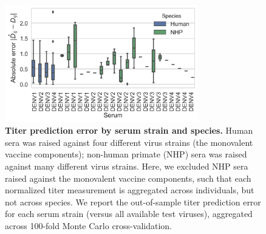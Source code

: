 \documentclass[11pt,oneside,letterpaper]{article}
\begin{document}
\begin{figure}[ht]
\centering
	\includegraphics[width=0.75\textwidth]{../figures/png/titer_species_error.png}
	\caption{\textbf{Titer prediction error by serum strain and species.}
  Human sera was raised against four different virus strains (the monovalent vaccine components); non-human primate (NHP) sera was raised against many different virus strains.
  Here, we excluded NHP sera raised against the monovalent vaccine components, such that each normalized titer measurement is aggregated across individuals, but not across species.
  We report the out-of-sample titer prediction error for each serum strain (versus all available test viruses), aggregated across 100-fold Monte Carlo cross-validation.
	}
	\label{species_titers}
\end{figure}
\end{document}

